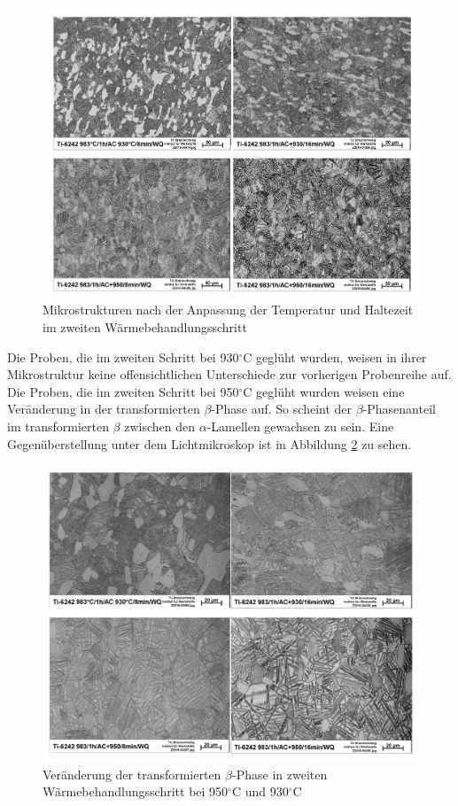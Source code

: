 \begin{figure}[h]
\centering
\includegraphics[width=0.9\linewidth]{./Bilder/Abbildung 14}
\caption[Abbildung 14]{Mikrostrukturen nach der Anpassung der Temperatur und Haltezeit im zweiten Wärmebehandlungsschritt}
\label{fig:abbildung-14}
\end{figure}

Die Proben, die im zweiten Schritt bei 930$^\circ$C geglüht wurden, weisen in ihrer Mikrostruktur keine offensichtlichen Unterschiede zur vorherigen Probenreihe auf. Die Proben, die im zweiten Schritt bei 950$^\circ$C geglüht wurden weisen eine Veränderung in der transformierten $\beta$-Phase auf. So scheint der $\beta$-Phasenanteil im transformierten $\beta$ zwischen den $\alpha$-Lamellen gewachsen zu sein. Eine Gegenüberstellung unter dem Lichtmikroskop ist in Abbildung \ref{fig:abbildung-15} zu sehen.

\begin{figure}[h]
\centering
\includegraphics[width=0.9\linewidth]{./Bilder/Abbildung 15}
\caption[Abbildung 15]{Veränderung der transformierten $\beta$-Phase in zweiten Wärmebehandlungsschritt bei 950$^\circ$C und 930$^\circ$C}
\label{fig:abbildung-15}
\end{figure}

